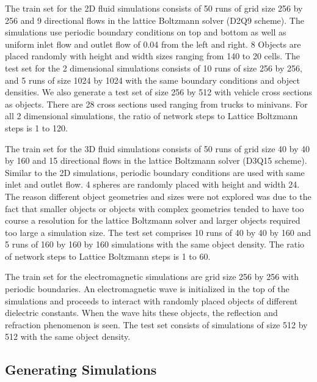 \documentclass{article}
\begin{document}
The train set for the 2D fluid simulations consists of 50 runs of grid size 256 by 256 and 9 directional flows in the lattice Boltzmann solver (D2Q9 scheme)\cite{guo2013lattice}. The simulations use periodic boundary conditions on top and bottom as well as uniform inlet flow and outlet flow of 0.04 from the left and right. 8 Objects are placed randomly with height and width sizes ranging from 140 to 20 cells. The test set for the 2 dimensional simulations consists of 10 runs of size 256 by 256, and 5 runs of size 1024 by 1024 with the same boundary conditions and object densities. We also generate a test set of size 256 by 512 with vehicle cross sections as objects. There are 28 cross sections used ranging from trucks to minivans. For all 2 dimensional simulations, the ratio of network steps to Lattice Boltzmann steps is 1 to 120.

The train set for the 3D fluid simulations consists of 50 runs of grid size 40 by 40 by 160 and 15 directional flows in the lattice Boltzmann solver (D3Q15 scheme)\cite{guo2013lattice}. Similar to the 2D simulations, periodic boundary conditions are used with same inlet and outlet flow. 4 spheres are randomly placed with height and width 24. The reason different object geometries and sizes were not explored was due to the fact that smaller objects or objects with complex geometries tended to have too course a resolution for the lattice Boltzmann solver and larger objects required too large a simulation size. The test set comprises 10 runs of 40 by 40 by 160 and 5 runs of 160 by 160 by 160 simulations with the same object density. The ratio of network steps to Lattice Boltzmann steps is 1 to 60.

The train set for the electromagnetic simulations are grid size 256 by 256 with periodic boundaries. An electromagnetic wave is initialized in the top of the simulations and proceeds to interact with randomly placed objects of different dielectric constants. When the wave hits these objects, the reflection and refraction phenomenon is seen. The test set consists of simulations of size 512 by 512 with the same object density.

\subsection{Generating Simulations}
\end{document}
